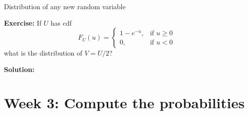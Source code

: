 \documentclass{beamer}
\begin{document}
\begin{frame}{Distribution of any new random variable}

{\bf Exercise:} If $U$ has cdf 
\[ 
F_U(u)=\left\{  
             \begin{array}{lr}  
  1- e^{-u},  & \mbox{if $u\geq 0$}\\
            0, &  \mbox{if $u<0$}
              \end{array}  
\right.\] 
what is the distribution of $V=U/2$?



{\bf Solution:} 

\end{frame}

\section{Week 3: Compute the probabilities}
\end{document}
